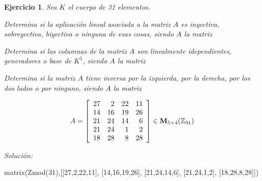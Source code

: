\documentclass[12pt]{amsart}
\newtheorem{ejer}{Ejercicio}
\begin{document}
\begin{ejer} Sea $K$ el cuerpo de 31 elementos.
\newline
\noindent\begin{minipage}{\textwidth}
\begin{tcolorbox}[colback = green!20!white,title=Versión Aplicaciones]
Determina si la aplicaci\'on lineal asociada a la matriz $A$ es inyectiva, sobreyectiva, biyectiva o ninguna de esas cosas, siendo $A$ la matriz \end{tcolorbox}
\end{minipage} \newline
\noindent\begin{minipage}{\textwidth}
\begin{tcolorbox}[colback = blue!20!white,title=Versión Vectores]
Determina si las columnas de la matriz $A$ son linealmente idependientes, generadores o base de $K^{5}$, siendo $A$ la matriz \end{tcolorbox}
\end{minipage} \newline
\noindent\begin{minipage}{\textwidth} 
\begin{tcolorbox}[colback = red!20!white,title=Versión Inversas]
Determina si la matriz $A$ tiene inversa por la izquierda, por la derecha, por los dos lados o por ninguno, siendo $A$ la matriz 
\end{tcolorbox}
\end{minipage}
\[ A = \left[\begin{array}{rrrr}
27 & 2 & 22 & 11 \\
14 & 16 & 19 & 26 \\
21 & 24 & 14 & 6 \\
21 & 24 & 1 & 2 \\
18 & 28 & 8 & 28
\end{array}\right] \in {\bf M}_{5\times 4}({\mathbb Z}_{31})\]
\end{ejer}

{\it Soluci\'on:}

\begin{sageblock}
matrix(Zmod(31),[[27,2,22,11],
[14,16,19,26],
[21,24,14,6],
[21,24,1,2],
[18,28,8,28]])
\end{sageblock}

\end{document}
